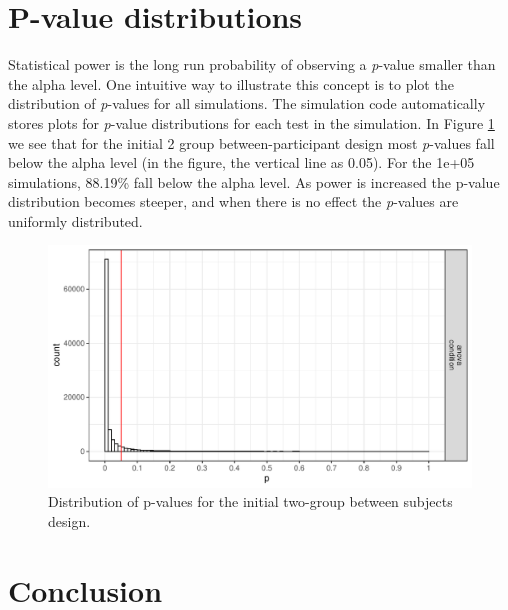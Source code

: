 \documentclass[
  ,jou,floatsintext]{apa6}
\begin{document}
\hypertarget{p-value-distributions}{%
\section{P-value distributions}\label{p-value-distributions}}

Statistical power is the long run probability of observing a \emph{p}-value smaller than the alpha level.
One intuitive way to illustrate this concept is to plot the distribution of \emph{p}-values for all simulations.
The simulation code automatically stores plots for \emph{p}-value distributions for each test in the simulation.
In Figure \ref{fig:p-plot} we see that for the initial 2 group between-participant design most \emph{p}-values fall below the alpha level (in the figure, the vertical line as 0.05).
For the 1e+05 simulations, 88.19\% fall below the alpha level.
As power is increased the p-value distribution becomes steeper, and when there is no effect the \emph{p}-values are uniformly distributed.

\begin{figure}
\centering
\includegraphics{0.1_Simulation_Based_Power_Analysis_For_Factorial_ANOVA_Designs_files/figure-latex/p-plot-1.pdf}
\caption{\label{fig:p-plot}Distribution of p-values for the initial two-group between subjects design.}
\end{figure}

\hypertarget{conclusion}{%
\section{Conclusion}\label{conclusion}}
\end{document}
